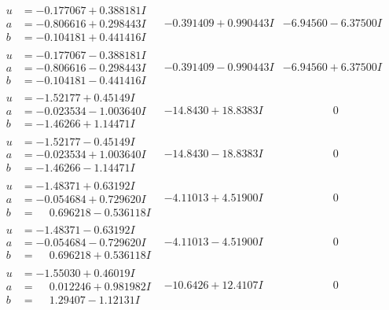 \documentclass[1p]{elsarticle_modified}
\theoremstyle{definition}
\begin{document}
$$\begin{array}{c|c|c}
\begin{aligned}
u &= -0.177067 + 0.388181 I \\
a &= -0.806616 + 0.298443 I \\
b &= -0.104181 + 0.441416 I\end{aligned}
 & -0.391409 + 0.990443 I & -6.94560 - 6.37500 I \\ \hline\begin{aligned}
u &= -0.177067 - 0.388181 I \\
a &= -0.806616 - 0.298443 I \\
b &= -0.104181 - 0.441416 I\end{aligned}
 & -0.391409 - 0.990443 I & -6.94560 + 6.37500 I \\ \hline\begin{aligned}
u &= -1.52177 + 0.45149 I \\
a &= -0.023534 - 1.003640 I \\
b &= -1.46266 + 1.14471 I\end{aligned}
 & -14.8430 + 18.8383 I & \phantom{-0.000000 } 0 \\ \hline\begin{aligned}
u &= -1.52177 - 0.45149 I \\
a &= -0.023534 + 1.003640 I \\
b &= -1.46266 - 1.14471 I\end{aligned}
 & -14.8430 - 18.8383 I & \phantom{-0.000000 } 0 \\ \hline\begin{aligned}
u &= -1.48371 + 0.63192 I \\
a &= -0.054684 + 0.729620 I \\
b &= \phantom{-}0.696218 - 0.536118 I\end{aligned}
 & -4.11013 + 4.51900 I & \phantom{-0.000000 } 0 \\ \hline\begin{aligned}
u &= -1.48371 - 0.63192 I \\
a &= -0.054684 - 0.729620 I \\
b &= \phantom{-}0.696218 + 0.536118 I\end{aligned}
 & -4.11013 - 4.51900 I & \phantom{-0.000000 } 0 \\ \hline\begin{aligned}
u &= -1.55030 + 0.46019 I \\
a &= \phantom{-}0.012246 + 0.981982 I \\
b &= \phantom{-}1.29407 - 1.12131 I\end{aligned}
 & -10.6426 + 12.4107 I & \phantom{-0.000000 } 0 \\ \hline\begin{aligned}

\end{aligned}
\end{array}$$
\end{document}
